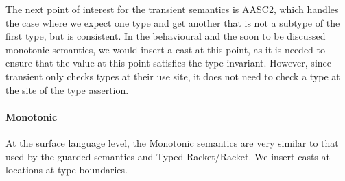 \documentclass[a4paper,USenglish]{tex/lipics-v2016}
\begin{document}
The next point of interest for the transient semantics is AASC2, which handles the case where we expect one type and get another that is not a subtype of the first type, but is consistent. In the behavioural and the soon to be discussed monotonic semantics, we would insert a cast at this point, as it is needed to ensure that the value at this point satisfies the type invariant. However, since transient only checks types at their use site, it does not need to check a type at the site of the type assertion.

\paragraph{Monotonic}

At the surface language level, the Monotonic semantics are very similar to that used by the guarded semantics and Typed Racket/Racket. We insert casts at locations at type boundaries.


\begin{mathpar}



\end{mathpar}

\begin{mathpar}

\end{mathpar}



\end{document}
